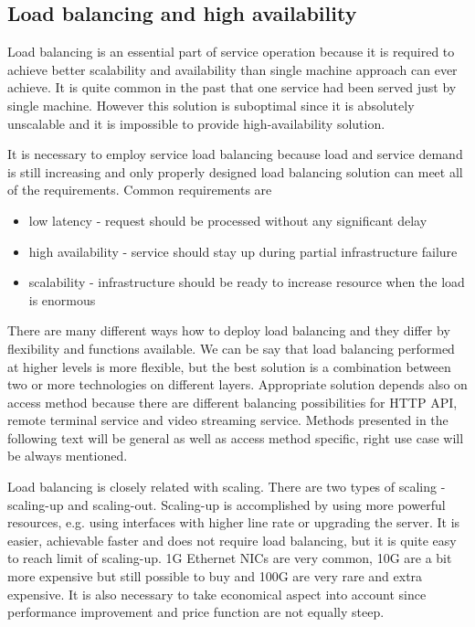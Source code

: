\subsection{Load balancing and high availability}

Load balancing is an essential part of service operation because it is required to achieve better scalability and availability than single machine approach can ever achieve. It is quite common in the past that one service had been served just by single machine. However this solution is suboptimal since it is absolutely unscalable and it is impossible to provide high-availability solution.

It is necessary to employ service load balancing because load and service demand is still increasing and only properly designed load balancing solution can meet all of the requirements. Common requirements are
	\begin{itemize}
		\item low latency - request should be processed without any significant delay
		\item high availability - service should stay up during partial infrastructure failure
		\item scalability - infrastructure should be ready to increase resource when the load is enormous
	\end{itemize}

There are many different ways how to deploy load balancing and they differ by flexibility and functions available. We can be say that load balancing performed at higher levels is more flexible, but the best solution is a combination between two or more technologies on different layers. Appropriate solution depends also on access method because there are different balancing possibilities for \Ac{HTTP} \Ac{API}, remote terminal service and video streaming service. Methods presented in the following text will be general as well as access method specific, right use case will be always mentioned.

Load balancing is closely related with scaling. There are two types of scaling - scaling-up and scaling-out. Scaling-up is accomplished by using more powerful resources, e.g. using interfaces with higher line rate or upgrading the server. It is easier, achievable faster and does not require load balancing, but it is quite easy to reach limit of scaling-up. 1G Ethernet \Ac{NIC}s are very common, 10G are a bit more expensive but still possible to buy and 100G are very rare and extra expensive. It is also necessary to take economical aspect into account since performance improvement and price function are not equally steep. 

